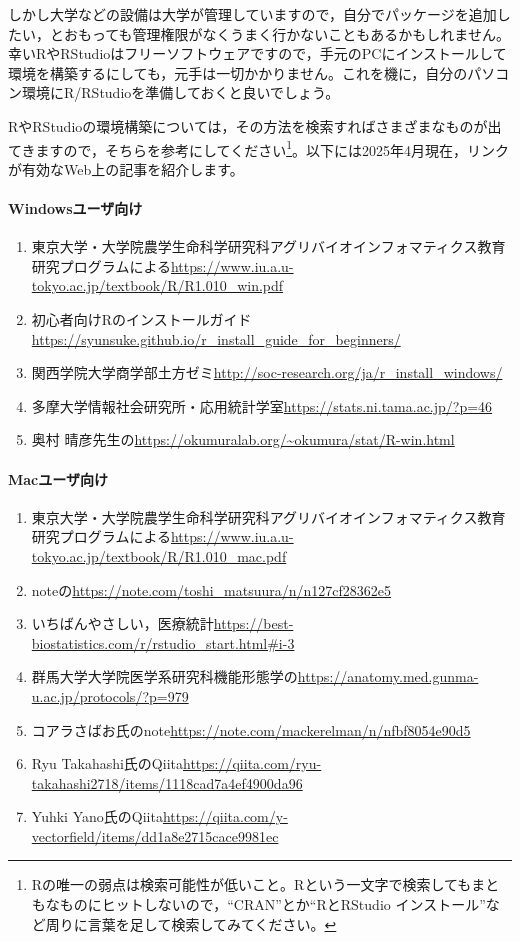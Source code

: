 \documentclass{ltjsbook}
\begin{document}
しかし大学などの設備は大学が管理していますので，自分でパッケージを追加したい，とおもっても管理権限がなくうまく行かないこともあるかもしれません。幸いRやRStudioはフリーソフトウェアですので，手元のPCにインストールして環境を構築するにしても，元手は一切かかりません。これを機に，自分のパソコン環境にR/RStudioを準備しておくと良いでしょう。

RやRStudioの環境構築については，その方法を検索すればさまざまなものが出てきますので，そちらを参考にしてください\footnote{Rの唯一の弱点は検索可能性が低いこと。Rという一文字で検索してもまともなものにヒットしないので，``CRAN''とか``RとRStudio インストール''など周りに言葉を足して検索してみてください。}。以下には2025年4月現在，リンクが有効なWeb上の記事を紹介します。

\paragraph{Windowsユーザ向け}
\begin{enumerate}
	\item 東京大学・大学院農学生命科学研究科アグリバイオインフォマティクス教育研究プログラムによる\url{https://www.iu.a.u-tokyo.ac.jp/textbook/R/R1.010_win.pdf}
	\item 初心者向けRのインストールガイド\url{https://syunsuke.github.io/r_install_guide_for_beginners/}
	\item 関西学院大学商学部土方ゼミ\url{http://soc-research.org/ja/r_install_windows/}
	\item 多摩大学情報社会研究所・応用統計学室\url{https://stats.ni.tama.ac.jp/?p=46}
	\item 奥村 晴彦先生の\url{https://okumuralab.org/~okumura/stat/R-win.html}
  \end{enumerate}
\paragraph{Macユーザ向け}
\begin{enumerate}
	\item 東京大学・大学院農学生命科学研究科アグリバイオインフォマティクス教育研究プログラムによる\url{https://www.iu.a.u-tokyo.ac.jp/textbook/R/R1.010_mac.pdf}
	\item noteの\url{https://note.com/toshi_matsuura/n/n127cf28362e5}
	\item いちばんやさしい，医療統計\url{https://best-biostatistics.com/r/rstudio_start.html#i-3}
	\item 群馬大学大学院医学系研究科機能形態学の\url{https://anatomy.med.gunma-u.ac.jp/protocols/?p=979}
	\item コアラさばお氏のnote\url{https://note.com/mackerelman/n/nfbf8054e90d5}
	\item Ryu Takahashi氏のQiita\url{https://qiita.com/ryu-takahashi2718/items/1118cad7a4ef4900da96}
	\item Yuhki Yano氏のQiita\url{https://qiita.com/y-vectorfield/items/dd1a8e2715cace9981ec}
\end{enumerate}
\end{document}

